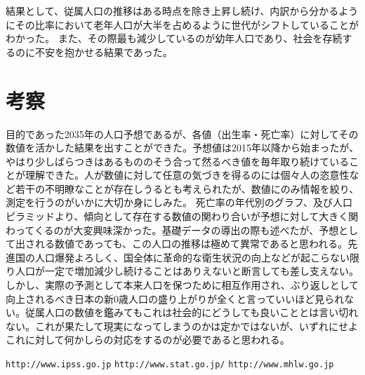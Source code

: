 \documentclass[uplatex, titlepage]{jsarticle}
\begin{document}
  結果として、従属人口の推移はある時点を除き上昇し続け、内訳から分かるようにその比率において老年人口が大半を占めるように世代がシフトしていることがわかった。
また、その際最も減少しているのが幼年人口であり、社会を存続するのに不安を抱かせる結果であった。

\section{考察}

  目的であった2035年の人口予想であるが、各値（出生率・死亡率）に対してその数値を活かした結果を出すことができた。予想値は2015年以降から始まったが、やはり少しばらつきはあるもののそう合って然るべき値を毎年取り続けていることが理解できた。人が数値に対して任意の気づきを得るのには個々人の恣意性など若干の不明瞭なことが存在しうるとも考えられたが、数値にのみ情報を絞り、測定を行うのがいかに大切か身にしみた。
  死亡率の年代別のグラフ、及び人口ピラミッドより、傾向として存在する数値の関わり合いが予想に対して大きく関わってくるのが大変興味深かった。基礎データの導出の際も述べたが、予想として出される数値であっても、この人口の推移は極めて異常であると思われる。先進国の人口爆発よろしく、国全体に革命的な衛生状況の向上などが起こらない限り人口が一定で増加減少し続けることはありえないと断言しても差し支えない。しかし、実際の予測として本来人口を保つために相互作用され、ぶり返しとして向上されるべき日本の新0歳人口の盛り上がりが全くと言っていいほど見られない。従属人口の数値を鑑みてもこれは社会的にどうしても良いこととは言い切れない。これが果たして現実になってしまうのかは定かではないが、いずれにせよこれに対して何かしらの対応をするのが必要であると思われる。

\begin{thebibliography}{99}
   \verb+http://www.ipss.go.jp+
   \verb+http://www.stat.go.jp/+
   \verb+http://www.mhlw.go.jp+
  \end{thebibliography}
\end{document}
